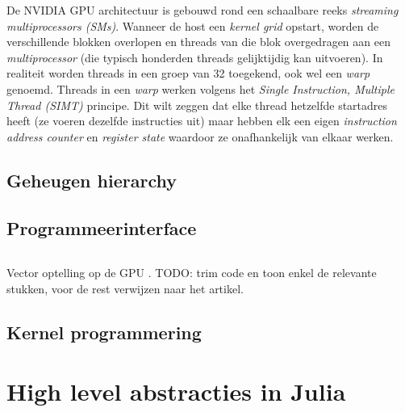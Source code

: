 

De NVIDIA GPU architectuur is gebouwd rond een schaalbare reeks \textit{streaming multiprocessors (SMs)}. Wanneer de host een \textit{kernel grid} opstart, worden de verschillende blokken overlopen en threads van die blok overgedragen aan een \textit{multiprocessor} (die typisch honderden threads gelijktijdig kan uitvoeren). In realiteit worden threads in een groep van 32 toegekend, ook wel een \textit{warp} genoemd. Threads in een \textit{warp} werken volgens het \textit{Single Instruction, Multiple Thread (SIMT)} principe. Dit wilt zeggen dat elke thread hetzelfde startadres heeft (ze voeren dezelfde instructies uit) maar hebben elk een eigen \textit{instruction address counter} en \textit{register state} waardoor ze onafhankelijk van elkaar werken.

\subsection{Geheugen hierarchy}

\subsection{Programmeerinterface}
\label{subsec:programminginterface}


\begin{code}
	\inputminted{c++}{codelistings/vecadd.cu}
	\caption{Vector optelling op de GPU \cite{Harris2017}. TODO: trim code en toon enkel de relevante stukken, voor de rest verwijzen naar het artikel.}
\end{code}

\subsection{Kernel programmering}

\section{High level abstracties in Julia}
\label{sec:julia_abstractions}


